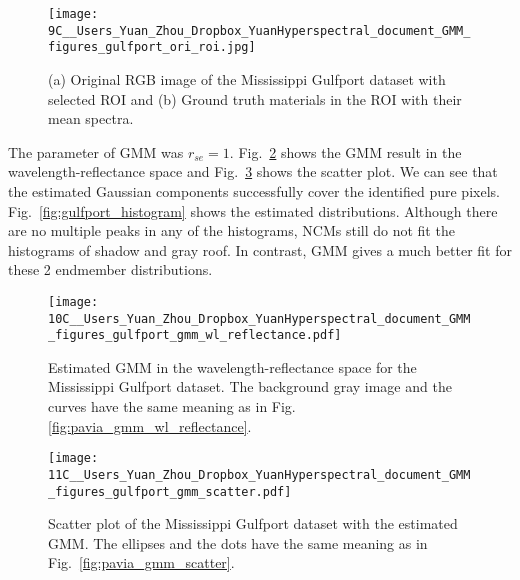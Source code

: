 \documentclass[twocolumn,english]{IEEEtran}
\theoremstyle{plain}
\begin{document}
\begin{figure}
\begin{centering}
\texttt{[image: 9C\_\_Users\_Yuan\_Zhou\_Dropbox\_YuanHyperspectral\_document\_GMM\_figures\_gulfport\_ori\_roi.jpg]}
\par\end{centering}
\caption{(a) Original RGB image of the Mississippi Gulfport dataset with selected
ROI and (b) Ground truth materials in the ROI with their mean spectra.}

\label{fig:gulfport_roi}
\end{figure}

The parameter of GMM was $r_{se}=1$. Fig.~\ref{fig:gulfport_gmm_wl_reflectance}
shows the GMM result in the wavelength-reflectance space and Fig.~\ref{fig:gulfport_gmm_scatter}
shows the scatter plot. We can see that the estimated Gaussian components
successfully cover the identified pure pixels. Fig.~\ref{fig:gulfport_histogram}
shows the estimated distributions. Although there are no multiple
peaks in any of the histograms, NCMs still do not fit the histograms
of shadow and gray roof. In contrast, GMM gives a much better fit
for these 2 endmember distributions.

\begin{figure}
\begin{centering}
\texttt{[image: 10C\_\_Users\_Yuan\_Zhou\_Dropbox\_YuanHyperspectral\_document\_GMM\_figures\_gulfport\_gmm\_wl\_reflectance.pdf]}
\par\end{centering}
\caption{Estimated GMM in the wavelength-reflectance space for the Mississippi
Gulfport dataset. The background gray image and the curves have the
same meaning as in Fig.\,\ref{fig:pavia_gmm_wl_reflectance}.}

\label{fig:gulfport_gmm_wl_reflectance}
\end{figure}

\begin{figure}
\begin{centering}
\texttt{[image: 11C\_\_Users\_Yuan\_Zhou\_Dropbox\_YuanHyperspectral\_document\_GMM\_figures\_gulfport\_gmm\_scatter.pdf]}
\par\end{centering}
\caption{Scatter plot of the Mississippi Gulfport dataset with the estimated
GMM. The ellipses and the dots have the same meaning as in Fig.~\ref{fig:pavia_gmm_scatter}.}

\label{fig:gulfport_gmm_scatter}
\end{figure}
\end{document}
